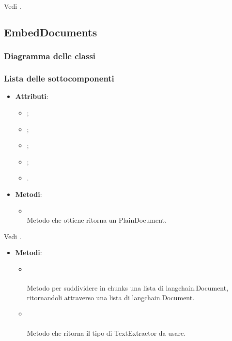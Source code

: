 \documentclass[10pt, a4paper]{article}
\begin{document}
Vedi .



\subsection{EmbedDocuments}
\subsubsection{Diagramma delle classi}
\subsubsection{Lista delle sottocomponenti}

\label{AWSDocumentDettaglio}
\begin{itemize}
    \item \textbf{Attributi}:
    \begin{itemize}
        \item {};
        \item {};
        \item {};
        \item {};
        \item {}.
    \end{itemize}
    \item \textbf{Metodi}:
    \begin{itemize}
        \item {}\\
        Metodo che ottiene ritorna un PlainDocument.
    \end{itemize}
\end{itemize}   

Vedi .

\label{ChunkerizerDettaglio}
\begin{itemize}
    \item \textbf{Metodi}:
    \begin{itemize}
        \item {}\\ \\
        Metodo per suddividere in chunks una lista di langchain.Document, ritornandoli attraverso una lista di langchain.Document.
        
        \item {}\\ \\
        Metodo che ritorna il tipo di TextExtractor da usare.
    \end{itemize}  
\end{itemize}
\end{document}

